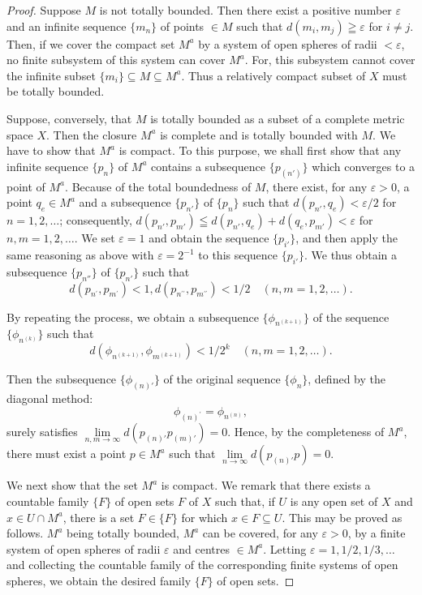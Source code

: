 \begin{proof}
 Suppose $M$ is not totally bounded. Then there exist a positive number $\varepsilon$ and an infinite sequence $\{m_{n}\}$ of points $\in M$ such that $d(m_{i}, m_{j}) \geqq \varepsilon$ for $i \neq j$. Then, if we cover the compact set $M^{a}$ by a system of open spheres of radii $< \varepsilon$, no finite subsystem of this system can cover $M^{a}$. For, this subsystem cannot cover the infinite subset $\{m_{i}\} \subseteq M \subseteq M^{a}$. Thus a relatively compact subset of $X$ must be totally bounded. 

Suppose, conversely, that $M$ is totally bounded as a subset of a complete metric space $X$. Then the closure $M^a$ is complete and is totally bounded with $M$. We have to show that $M^a$ is compact. To this purpose, we shall first show that any infinite sequence $\{p_n\}$ of $M^a$ contains a subsequence $\{p_{(n')}\}$ which converges to a point of $M^a$. Because of the total boundedness of $M$, there exist, for any $\varepsilon > 0$, a point $q_e \in M^a$ and a subsequence $\{p_{n'}\}$ of $\{p_n\}$ such that $d(p_{n'}, q_e) < \varepsilon / 2$ for $n = 1, 2, \ldots$; consequently, $d(p_{n'}, p_{m'}) \leqq d(p_{n'}, q_e) + d(q_e, p_{m'}) < \varepsilon$ for $n, m = 1, 2, \ldots$. We set $\varepsilon = 1$ and obtain the sequence $\{p_{i'}\}$, and then apply the same reasoning as above with $\varepsilon = 2^{-1}$ to this sequence $\{p_{i'}\}$. We thus obtain a subsequence $\{p_{n''}\}$ of $\{p_{n'}\}$ such that 
\[
d \left(p _ {n ^{\prime}}, p _ {m ^{\prime}}\right) < 1, d \left(p _ {n ^{\prime \prime}}, p _ {m ^{\prime \prime}}\right) < 1 / 2 \quad (n, m = 1, 2, \dots).
\]

By repeating the process, we obtain a subsequence $\{\phi_{n^{(k+1)}}\}$ of the sequence $\{\phi_{n^{(k)}}\}$ such that 
\[
d \left(\phi_ {n ^{(k+1)}}, \phi_ {m ^{(k+1)}}\right) < 1 / 2 ^{k} \quad (n, m = 1, 2, \dots).
\]

Then the subsequence $\{\phi_{(n)'}\}$ of the original sequence $\{\phi_n\}$, defined by the diagonal method: 
\[
\phi_ {(n) ^{\prime}} = \phi_ {n ^{(n)}},
\]
surely satisfies $\lim\limits_{n,m\to \infty}d(p_{(n)'}p_{(m)'}) = 0$. Hence, by the completeness of $M^a$, there must exist a point $p\in M^a$ such that $\lim\limits_{n\to \infty}d(p_{(n)'}p) = 0$. 

We next show that the set $M^{a}$ is compact. We remark that there exists a countable family $\{F\}$ of open sets $F$ of $X$ such that, if $U$ is any open set of $X$ and $x \in U \cap M^{a}$, there is a set $F \in \{F\}$ for which $x \in F \subseteq U$. This may be proved as follows. $M^{a}$ being totally bounded, $M^{a}$ can be covered, for any $\varepsilon > 0$, by a finite system of open spheres of radii $\varepsilon$ and centres $\in M^{a}$. Letting $\varepsilon = 1, 1/2, 1/3, \ldots$ and collecting the countable family of the corresponding finite systems of open spheres, we obtain the desired family $\{F\}$ of open sets. 


\end{proof}
